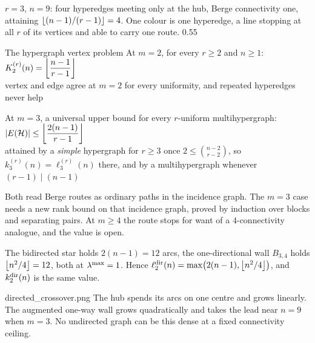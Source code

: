 \documentclass[aspectratio=1610,11pt]{beamer}
\begin{document}
  {\fighyperstar}
  {$r=3$, $n=9$: four hyperedges meeting only at the hub, Berge connectivity one, attaining $\left\lfloor (n-1)/(r-1)\right\rfloor=4$. One colour is one hyperedge, a line stopping at all $r$ of its vertices and able to carry one route.}
  {0.55}

\begin{frame}{The hypergraph vertex problem}
\vfill
\centering
{\color{black!45}\small At $m=2$, for every $r\ge2$ and $n\ge1$:}\\[6pt]
{\color{KULblauw1}\Large $\displaystyle K_2^{(r)}(n)=\left\lfloor \frac{n-1}{r-1}\right\rfloor$}\\[4pt]
{\footnotesize\color{black!55} vertex and edge agree at $m=2$ for every uniformity, and repeated hyperedges never help}

\vspace{10pt}
{\color{black!45}\small At $m=3$, a universal upper bound for every $r$-uniform multihypergraph:}\\[6pt]
{\color{KULblauw1}\Large $\displaystyle |E(\mathcal{H})|\le\left\lfloor \frac{2(n-1)}{r-1}\right\rfloor$}\\[6pt]
{\footnotesize\color{black!55} attained by a \emph{simple} hypergraph for $r\ge3$ once $2\le\binom{n-2}{r-2}$, so $k_3^{(r)}(n)=\ell_3^{(r)}(n)$ there, and by a multihypergraph whenever $(r-1)\mid(n-1)$}

\vspace{8pt}
\begin{minipage}{0.86\textwidth}
{\footnotesize\color{black!60} Both read Berge routes as ordinary paths in the incidence graph. The $m=3$ case needs a new rank bound on that incidence graph, proved by induction over blocks and separating pairs. At $m\ge4$ the route stops for want of a $4$-connectivity analogue, and the value is open.}
\end{minipage}
\vfill
\end{frame}


  {\figdigraphmtwo}
  {The bidirected star holds $2(n-1)=12$ arcs, the one-directional wall $B_{3,4}$ holds $\left\lfloor n^2/4\right\rfloor=12$, both at $\lambda^{\max}=1$. Hence $\ell_2^{\mathrm{dir}}(n)=\max\bigl(2(n-1),\left\lfloor n^2/4\right\rfloor\bigr)$, and $k_2^{\mathrm{dir}}(n)$ is the same value.}

  {directed_crossover.png}
  {The hub spends its arcs on one centre and grows linearly. The augmented one-way wall grows quadratically and takes the lead near $n=9$ when $m=3$. No undirected graph can be this dense at a fixed connectivity ceiling.}
\end{document}
